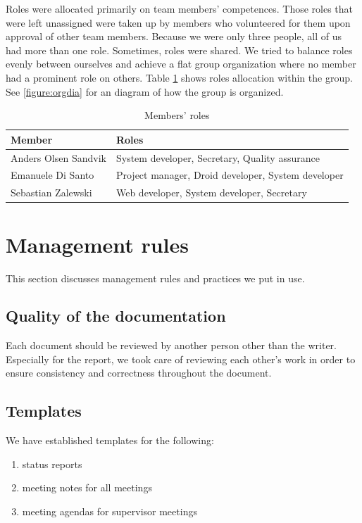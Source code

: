 Roles were allocated primarily on team members' competences.
Those roles that were left unassigned were taken up by members who volunteered for them upon approval 
of other team members.
Because we were only three people, all of us had more than one role. Sometimes, roles were shared.
We tried to balance roles evenly between ourselves and achieve a flat group organization where no member
had a prominent role on others. Table \ref{table:roles} shows roles allocation within the group.
See \ref{figure:orgdia} for an diagram of how the group is organized.

\begin{table}[h]
\begin{center}
\begin{tabular}{ | l | l | }
  \hline
  \textbf{Member} & \textbf{Roles} \\
  \hline\noalign{\smallskip}\hline
  Anders Olsen Sandvik  &  System developer, Secretary, Quality assurance\\
  Emanuele Di Santo     &  Project manager, Droid developer, System developer\\
  Sebastian Zalewski    &  Web developer, System developer, Secretary\\
  \hline
\end{tabular}
\end{center}
\caption{Members' roles}
\label{table:roles}
\end{table}

\newpage
\section{Management rules}
\label{section:rules}

This section discusses management rules and practices we put in use.

\subsection{Quality of the documentation}
Each document should be reviewed by another person other than the writer.
Especially for the report, we took care of reviewing each other's work in order to ensure
consistency and correctness throughout the document.

\subsection{Templates}
We have established templates for the following:
\begin{enumerate}
\item status reports
\item meeting notes for all meetings
\item meeting agendas for supervisor meetings
\end{enumerate}

